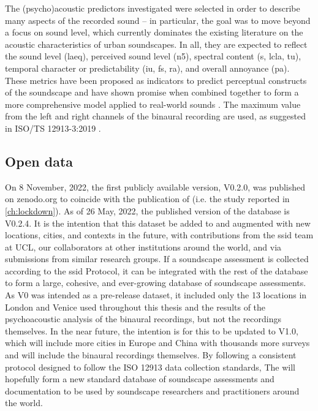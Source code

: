    The (psycho)acoustic predictors investigated were selected in order to describe many aspects of the recorded sound -- in particular, the goal was to move beyond a focus on sound level, which currently dominates the existing literature on the acoustic characteristics of urban soundscapes. In all, they are expected to reflect the sound level (\gls{laeq}), perceived sound level (\gls{n5}), spectral content (\gls{s}, \gls{lcla}, \gls{tu}), temporal character or predictability (\gls{iu}, \gls{fs}, \gls{ra}), and overall annoyance (\gls{pa}). These metrics have been proposed as indicators to predict perceptual constructs of the soundscape \citep{Aletta2017Dimensions, Aletta2016Soundscape} and have shown promise when combined together to form a more comprehensive model applied to real-world sounds \citep{Orga2021Multilevel}. The maximum value from the left and right channels of the binaural recording are used, as suggested in ISO/TS 12913-3:2019 \citep{ISO12913Part3}.


\subsection{Open data}
On 8 November, 2022, the first publicly available version, V0.2.0, was published on zenodo.org to coincide with the publication of \citet{Mitchell2021Investigating} (i.e. the study reported in \cref{ch:lockdown}). As of 26 May, 2022, the published version of the database is V0.2.4. It is the intention that this dataset be added to and augmented with new locations, cities, and contexts in the future, with contributions from the \gls{ssid} team at UCL, our collaborators at other institutions around the world, and via submissions from similar research groups. If a soundscape assessment is collected according to the \gls{ssid} Protocol, it can be integrated with the rest of the database to form a large, cohesive, and ever-growing database of soundscape assessments. As V0 was intended as a pre-release dataset, it included only the 13 locations in London and Venice used throughout this thesis and the results of the psychoacoustic analysis of the binaural recordings, but not the recordings themselves. In the near future, the intention is for this to be updated to V1.0, which will include more cities in Europe and China with thousands more surveys and will include the binaural recordings themselves. By following a consistent protocol designed to follow the ISO 12913 data collection standards, The  \citep{Mitchell2021International} will hopefully form a new standard database of soundscape assessments and documentation to be used by soundscape researchers and practitioners around the world.

